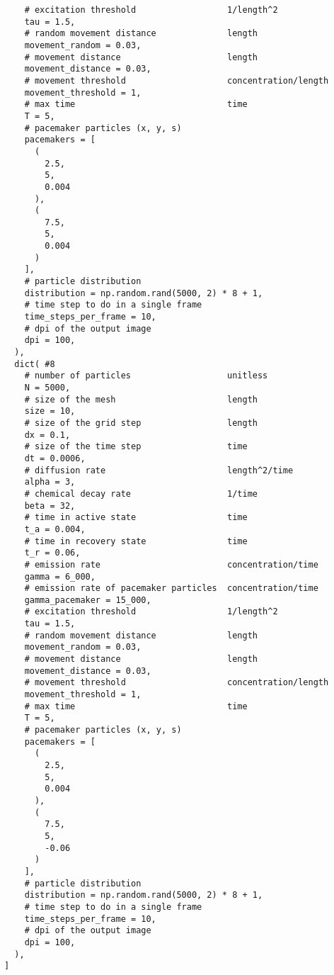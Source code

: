 \begin{verbatim}
    # excitation threshold                  1/length^2
    tau = 1.5,
    # random movement distance              length
    movement_random = 0.03,
    # movement distance                     length
    movement_distance = 0.03,
    # movement threshold                    concentration/length
    movement_threshold = 1,
    # max time                              time
    T = 5,
    # pacemaker particles (x, y, s)
    pacemakers = [
      (
        2.5,
        5,
        0.004
      ),
      (
        7.5,
        5,
        0.004
      )
    ],
    # particle distribution
    distribution = np.random.rand(5000, 2) * 8 + 1,
    # time step to do in a single frame
    time_steps_per_frame = 10,
    # dpi of the output image
    dpi = 100,
  ),
  dict( #8
    # number of particles                   unitless
    N = 5000,
    # size of the mesh                      length
    size = 10,
    # size of the grid step                 length
    dx = 0.1,
    # size of the time step                 time
    dt = 0.0006,
    # diffusion rate                        length^2/time
    alpha = 3,
    # chemical decay rate                   1/time
    beta = 32,
    # time in active state                  time
    t_a = 0.004,
    # time in recovery state                time
    t_r = 0.06,
    # emission rate                         concentration/time
    gamma = 6_000,
    # emission rate of pacemaker particles  concentration/time
    gamma_pacemaker = 15_000,
    # excitation threshold                  1/length^2
    tau = 1.5,
    # random movement distance              length
    movement_random = 0.03,
    # movement distance                     length
    movement_distance = 0.03,
    # movement threshold                    concentration/length
    movement_threshold = 1,
    # max time                              time
    T = 5,
    # pacemaker particles (x, y, s)
    pacemakers = [
      (
        2.5,
        5,
        0.004
      ),
      (
        7.5,
        5,
        -0.06
      )
    ],
    # particle distribution
    distribution = np.random.rand(5000, 2) * 8 + 1,
    # time step to do in a single frame
    time_steps_per_frame = 10,
    # dpi of the output image
    dpi = 100,
  ),
]
\end{verbatim}